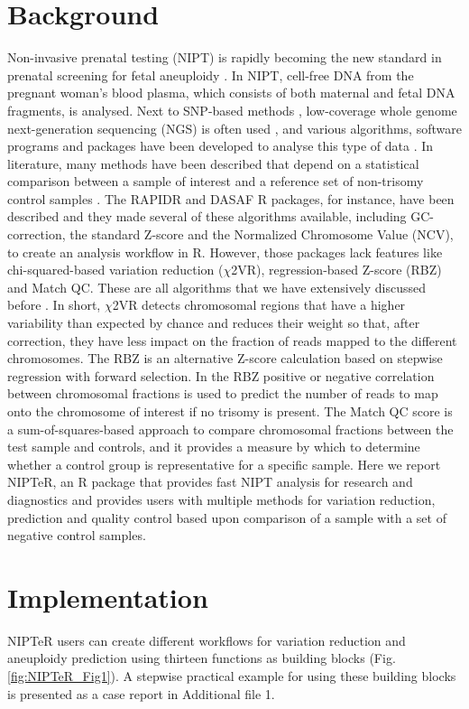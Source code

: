 \section{Background}\label{Background}
Non-invasive prenatal testing (NIPT) is rapidly becoming the new standard in prenatal screening for fetal aneuploidy \cite{Allyse_2015}. 
In NIPT, cell-free DNA from the pregnant woman’s blood plasma, which consists of both maternal and fetal DNA fragments, is analysed. 
Next to SNP-based methods \cite{Hall_2014}, low-coverage whole genome next-generation sequencing (NGS) is often used \cite{Chiu_2008,Sehnert_2011}, and various algorithms, software programs and packages have been developed to analyse this type of data \cite{Chen_2011b, Straver_2013, Yang_2017, Sauk_2018, Phan_2018}. 
In literature, many methods have been described that depend on a statistical comparison between a sample of interest and a reference set of non-trisomy control samples \cite{Chiu_2008,Sehnert_2011,Fan_2010,Johansson_2017}. 
The RAPIDR and DASAF R packages, for instance, have been described \cite{Lo_2014,Liu_2016} and they made several of these algorithms available, including GC-correction, the standard Z-score and the Normalized Chromosome Value (NCV), to create an analysis workflow in R. 
However, those packages lack features like chi-squared-based variation reduction ($\chi$2VR), regression-based Z-score (RBZ) and Match QC. 
These are all algorithms that we have extensively discussed before \cite{Johansson_2017}. 
In short, $\chi$2VR detects chromosomal regions that have a higher variability than expected by chance and reduces their weight so that, after correction, they have less impact on the fraction of reads mapped to the different chromosomes. 
The RBZ is an alternative Z-score calculation based on stepwise regression with forward selection. 
In the RBZ positive or negative correlation between chromosomal fractions is used to predict the number of reads to map onto the chromosome of interest if no trisomy is present. 
The Match QC score is a sum-of-squares-based approach to compare chromosomal fractions between the test sample and controls, and it provides a measure by which to determine whether a control group is representative for a specific sample. 
Here we report NIPTeR, an R package that provides fast NIPT analysis for research and diagnostics and provides users with multiple methods for variation reduction, prediction and quality control based upon comparison of a sample with a set of negative control samples.

\section{Implementation}\label{Implementation}
NIPTeR users can create different workflows for variation reduction and aneuploidy prediction using thirteen functions as building blocks (Fig. \ref{fig:NIPTeR_Fig1}).
A stepwise practical example for using these building blocks is presented as a case report in Additional file 1.

